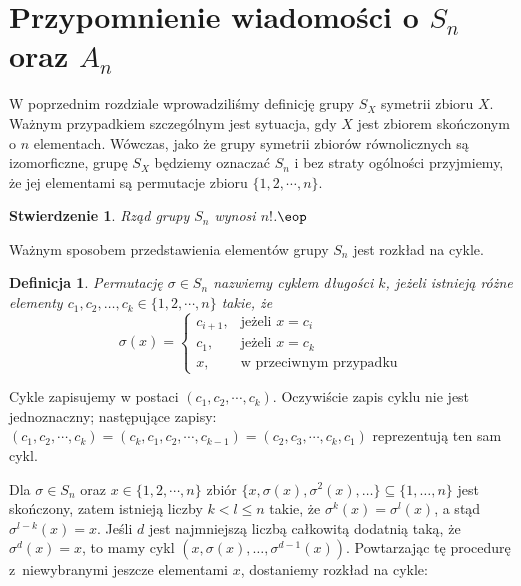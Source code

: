 \documentclass[licencjacka]{pracamgr}
\newtheorem{deff}{Definicja}[section]
\newtheorem{fact}{Stwierdzenie}[section]
\begin{document}
\section{Przypomnienie wiadomości o $S_n$ oraz $A_n$}

W poprzednim rozdziale wprowadziliśmy definicję grupy $S_X$ symetrii
zbioru $X$. Ważnym przypadkiem szczególnym jest sytuacja, gdy $X$
jest zbiorem skończonym o $n$ elementach. Wówczas, jako że grupy
symetrii zbiorów równolicznych są izomorficzne, grupę $S_X$ będziemy
oznaczać $S_n$ i bez straty ogólności przyjmiemy, że jej elementami
są permutacje zbioru $\{1, 2, \cdots, n\}$.

\begin{fact}
    Rząd grupy $S_n$ wynosi $n!$.\quad$\eop$
\end{fact}

Ważnym sposobem przedstawienia elementów grupy $S_n$ jest rozkład na
cykle.

\begin{deff}
    Permutację $\sigma \in S_n$ nazwiemy \emph{cyklem długości $k$},
    jeżeli istnieją różne elementy $c_1, c_2, \ldots, c_k \in \{1, 2, \cdots, n\}$ takie, że
    $$ \sigma(x) = \left\{
                \begin{array}{ll}
                    c_{i+1}, & \textrm{jeżeli $x = c_i$}\\
                    c_1,     & \textrm{jeżeli $x = c_k$}\\
                    x,       & \textrm{w przeciwnym przypadku}
                \end{array} \right.
    $$
\end{deff}

Cykle zapisujemy w postaci $(c_1, c_2, \cdots, c_k)$. Oczywiście zapis cyklu nie jest jednoznaczny; 
następujące zapisy: $(c_1, c_2, \cdots, c_k) = (c_k, c_1, c_2, \cdots, c_{k-1}) = (c_2, c_3, \cdots, c_k,
c_1)$ reprezentują ten sam cykl.

Dla $\sigma \in S_n$ oraz $x\in\{1, 2,\cdots, n\}$ zbiór
$\{x,\sigma(x),\sigma^2(x),\ldots\}\subseteq\{1,\ldots,n\}$ jest skończony, zatem istnieją
liczby $k<l\leq n$ takie, że $\sigma^k(x)=\sigma^l(x)$, a stąd $\sigma^{l-k}(x)=x$. Jeśli $d$ jest najmniejszą
liczbą całkowitą dodatnią taką, że $\sigma^d(x)=x$, to mamy cykl $\left(x,\sigma(x),\ldots,\sigma^{d-1}(x)\right)$.
Powtarzając tę procedurę z~niewybranymi jeszcze elementami $x$, dostaniemy rozkład na cykle:
\end{document}
